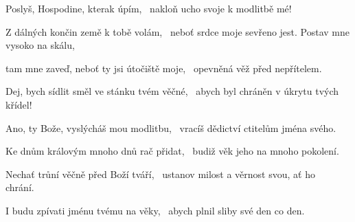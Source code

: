 \begin{psalmus}

Poslyš, Hospodine, kterak úpím,~\grestar{}
nakloň ucho svoje k modlitbě mé!~\Abardot{}

Z dálných končin země k tobě volám,~\grestar{}
neboť srdce moje sevřeno jest. Postav mne vysoko na skálu,~\Abardot{}

tam mne zaveď, neboť ty jsi útočiště moje,~\grestar{}
opevněná věž před nepřítelem.~\Abardot{}

Dej, bych sídlit směl ve stánku tvém věčné,~\grestar{}
abych byl chráněn v úkrytu tvých křídel!~\Abardot{}

Ano, ty Bože, vyslýcháš mou modlitbu,~\grestar{}
vracíš dědictví ctitelům jména svého.~\Abardot{}

Ke dnům královým mnoho dnů rač přidat,~\grestar{}
budiž věk jeho na mnoho pokolení.~\Abardot{}

Nechať trůní věčně před Boží tváří,~\grestar{}
ustanov milost a věrnost svou, ať ho chrání.~\Abardot{}

I budu zpívati jménu tvému na věky,~\grestar{}
abych plnil sliby své den co den.~\Abardot{}
\end{psalmus}

